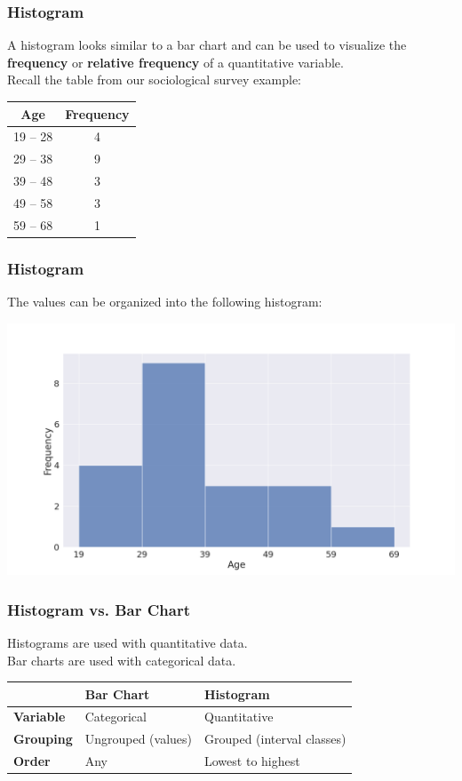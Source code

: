 \documentclass[aspectratio=169,11pt,svgnames,handout]{beamer}
\begin{document}
\begin{frame}
 \frametitle{Histogram}
 A histogram looks similar to a bar chart and can be used to visualize the
 \textbf{frequency} or \textbf{relative frequency} of a \alert{quantitative
 variable}.\\
 \pause
 Recall the table from our sociological survey example:
 \begin{center}
  \begin{tabular}{c|c}
   \textbf{Age} & \textbf{Frequency}\\
   \toprule
   19 -- 28 & 4\\
   29 -- 38 & 9\\
   39 -- 48 & 3\\
   49 -- 58 & 3\\
   59 -- 68 & 1
  \end{tabular}
 \end{center}
\end{frame}

\begin{frame}
 \frametitle{Histogram}
 The values can be organized into the following histogram:
 \begin{center}
  \includegraphics[width=.7\textwidth]{survey_hist.png}
 \end{center}
\end{frame}

\begin{frame}
 \frametitle{Histogram vs. Bar Chart}
 Histograms are used with \alert{quantitative} data.\\
 \pause
 Bar charts are used with \alert{categorical} data.\\
 \pause
 \begin{center}
  \begin{tabular}{lll}
   & \textbf{Bar Chart} & \textbf{Histogram}\\
   \toprule
   \textbf{Variable} & Categorical & Quantitative\\
   \midrule
   \textbf{Grouping} & Ungrouped (values) & Grouped (interval classes)\\
   \midrule
   \textbf{Order} & Any & Lowest to highest
  \end{tabular}
 \end{center}
\end{frame}
\end{document}
